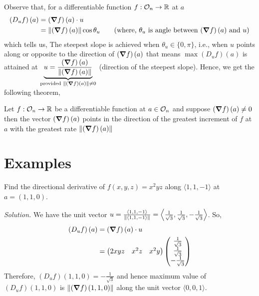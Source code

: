 \documentclass[../Analysis-3.tex]{subfiles}
\begin{document}
Observe that, for a differentiable function $ f: \mathcal{O}_{n} \to \mathbb{R} $ at $ a $
\begin{align*}
  \left( D_uf \right)\left( a \right)
   & = \left( \grad f\right)\left( a \right)\cdot u                                                                                                        \\
   & = \norm{\left( \grad f\right)\left( a \right)}\cos{\theta_u} \tag{where, $\theta_u$ is angle between $\left( \grad f\right)\left( a \right)$ and $u$}
\end{align*}
which tells us, The steepest slope is achieved when $ \theta_u \in \{0, \pi\} $, i.e., when $ u $ points along or opposite to the direction of $ \left( \grad f\right)\left( a \right) $
that means $ \max \left( D_uf \right)\left( a \right) $ is attained at $ \underbrace{u = \frac{\left( \grad f\right)\left( a \right)}{\norm{\left( \grad f\right)\left( a \right)}}}_{\text{provided } \norm{\left( \grad f\right)\left( a \right)} \not=0 } $ (direction of the steepest slope).
Hence, we get the following theorem,
\begin{Thm}{}{}
  Let $ f: \mathcal{O}_{n} \to \mathbb{R} $ be a differentiable function at $ a \in \mathcal{O}_{n} $ and suppose $ \left( \grad f\right)\left( a \right) \not= 0 $ then the vector $\left( \grad f\right)\left( a \right)$ points in the direction of the greatest increment of $ f $ at $ a $ with the greatest rate $ \norm{\left( \grad f\right)\left( a \right)} $
\end{Thm}

\section{Examples}

\begin{Eg}{}{}
  Find the directional derivative of $ f(x,y,z) = x^2yz $ along $ \langle 1,1,-1 \rangle $ at $ a = (1,1,0) $.
  
  \textit{Solution.} We have the unit vector $ u = \frac{\langle 1,1,-1 \rangle}{\norm{\langle 1,1,-1 \rangle}} = \left\langle \frac{1}{\sqrt{3}}, \frac{1}{\sqrt{3}}, -\frac{1}{\sqrt{3}} \right\rangle $. So,
  \begin{align*}
    \left( D_uf \right)\left( a \right)
     & = \left( \grad f\right)\left( a \right)\cdot u                                                                                       \\
     & = \begin{pmatrix} 2xyz & x^2z & x^2y \end{pmatrix}
    \begin{pmatrix} \frac{1}{\sqrt{3}} \\ \frac{1}{\sqrt{3}} \\ -\frac{1}{\sqrt{3}} \end{pmatrix} \\
  \end{align*}
  Therefore, $ \left( D_uf \right)(1,1,0) = -\frac{1}{\sqrt{3}} $ and hence maximum value of $ \left( D_uf \right)(1,1,0) $ is $ \norm{\left( \grad f\right)(1,1,0)} $ along the unit vector $ \langle 0,0,1 \rangle $.
\end{Eg}
\end{document}
